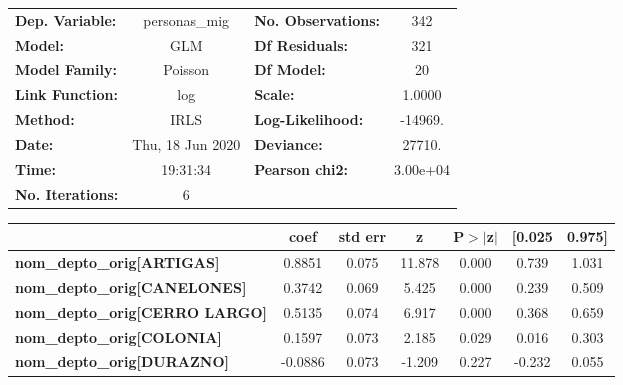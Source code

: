 \begin{center}
\begin{tabular}{lclc}
\toprule
\textbf{Dep. Variable:}                   &  personas\_mig   & \textbf{  No. Observations:  } &      342    \\
\textbf{Model:}                           &       GLM        & \textbf{  Df Residuals:      } &      321    \\
\textbf{Model Family:}                    &     Poisson      & \textbf{  Df Model:          } &       20    \\
\textbf{Link Function:}                   &       log        & \textbf{  Scale:             } &    1.0000   \\
\textbf{Method:}                          &       IRLS       & \textbf{  Log-Likelihood:    } &   -14969.   \\
\textbf{Date:}                            & Thu, 18 Jun 2020 & \textbf{  Deviance:          } &    27710.   \\
\textbf{Time:}                            &     19:31:34     & \textbf{  Pearson chi2:      } &  3.00e+04   \\
\textbf{No. Iterations:}                  &        6         & \textbf{                     } &             \\
\bottomrule
\end{tabular}
\begin{tabular}{lcccccc}
                                          & \textbf{coef} & \textbf{std err} & \textbf{z} & \textbf{P$> |$z$|$} & \textbf{[0.025} & \textbf{0.975]}  \\
\midrule
\textbf{nom\_depto\_orig[ARTIGAS]}        &       0.8851  &        0.075     &    11.878  &         0.000        &        0.739    &        1.031     \\
\textbf{nom\_depto\_orig[CANELONES]}      &       0.3742  &        0.069     &     5.425  &         0.000        &        0.239    &        0.509     \\
\textbf{nom\_depto\_orig[CERRO LARGO]}    &       0.5135  &        0.074     &     6.917  &         0.000        &        0.368    &        0.659     \\
\textbf{nom\_depto\_orig[COLONIA]}        &       0.1597  &        0.073     &     2.185  &         0.029        &        0.016    &        0.303     \\
\textbf{nom\_depto\_orig[DURAZNO]}        &      -0.0886  &        0.073     &    -1.209  &         0.227        &       -0.232    &        0.055     \\

\end{tabular}
\end{center}
